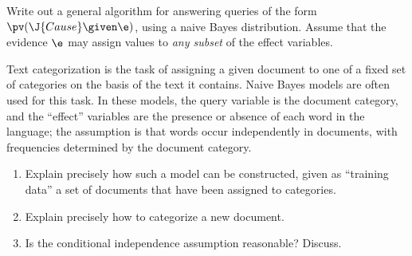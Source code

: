 
\begin{iexercise}
Write out a general algorithm for answering queries of the form
\(\pv(\J{Cause}\given \e)\), using a naive Bayes distribution. 
Assume that the evidence \(\e\)
may assign values to {\em any subset} of the effect variables.
\end{iexercise} 

\begin{exercise}
Text categorization is the task of assigning a given document to one
of a fixed set of categories on the basis of the text it contains.
Naive Bayes models are often used for this task. In these models, the
query variable is the document category, and the ``effect'' variables
are the presence or absence of each word in the language; the
assumption is that words occur independently in documents, with
frequencies determined by the document category.
\begin{enumerate}
\item Explain precisely how such a
model can be constructed, given as ``training data'' a set of
documents that have been assigned to categories. 
\item Explain precisely how to categorize a new document.
\item Is the conditional independence assumption reasonable? Discuss.
\end{enumerate}
\end{exercise} 



